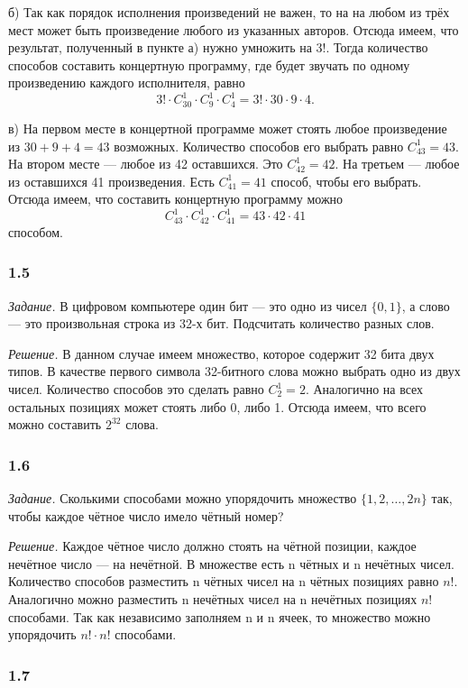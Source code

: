 \documentclass{book}
\begin{document}
б) Так как порядок исполнения произведений не важен, то на на любом из трёх мест может быть произведение любого из указанных авторов.
Отсюда имеем, что результат, полученный в пункте а) нужно умножить на $3!$.
Тогда количество способов составить концертную программу, где будет звучать по одному произведению каждого исполнителя, равно
$$ 3! \cdot C_{30}^1 \cdot C_9^1 \cdot C_4^1 = 3! \cdot 30 \cdot 9 \cdot 4.$$

в) На первом месте в концертной программе может стоять любое произведение из $30+9+4=43$ возможных.
Количество способов его выбрать равно $C_{43}^1=43$.
На втором месте --- любое из 42 оставшихся.
Это $C_{42}^1=42$.
На третьем --- любое из оставшихся 41 произведения.
Есть $C_{41}^1=41$ способ, чтобы его выбрать.
Отсюда имеем, что составить концертную программу можно
$$ C_{43}^1 \cdot C_{42}^1 \cdot C_{41}^1 = 43 \cdot 42 \cdot 41 $$ способом.

\subsubsection*{1.5}

\textit{Задание.} В цифровом компьютере один бит --- это одно из чисел $\{0, 1\}$, а слово --- это произвольная строка из 32-х бит.
Подсчитать количество разных слов.

\textit{Решение.} В данном случае имеем множество, которое содержит 32 бита двух типов.
В качестве первого символа 32-битного слова можно выбрать одно из двух чисел.
Количество способов это сделать равно $C_{2}^1=2$.
Аналогично на всех остальных позициях может стоять либо 0, либо 1.
Отсюда имеем, что всего можно составить $2^{32}$ слова.

\subsubsection*{1.6}
\textit{Задание.} Сколькими способами можно упорядочить множество $\{1, 2,  \dotsc , 2n\}$ так, чтобы каждое чётное число имело чётный номер?

\textit{Решение.} Каждое чётное число должно стоять на чётной позиции, каждое нечётное число --- на нечётной.
В множестве есть n чётных и n нечётных чисел.
Количество способов разместить n чётных чисел на n чётных позициях равно $n!$.
Аналогично можно разместить n нечётных чисел на n нечётных позициях $n!$ способами.
Так как независимо заполняем n и n ячеек, то множество можно упорядочить $n!\cdot n!$ способами.

\subsubsection*{1.7}
\end{document}
